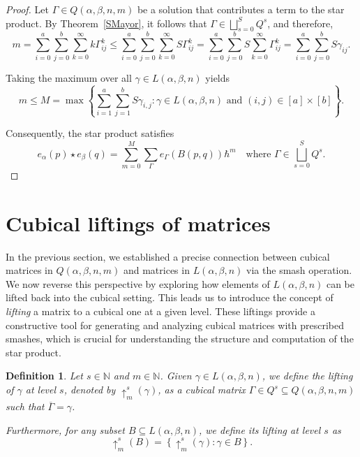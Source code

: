 \documentclass[11pt]{article}
\newtheorem{defi}[thm]{Definition}
\begin{document}
\begin{proof}
    Let $\Gamma \in Q(\alpha,\beta,n,m)$ be a solution that contributes a term to the star product. By Theorem~\ref{SMayor}, it follows that $\Gamma \in \bigsqcup_{s=0}^{S} Q^{s}$, and therefore,
    $$
    m=\sum_{i=0}^{a}\sum_{j=0}^{b}\sum_{k=0}^{\infty} k\Gamma_{ij}^{k}\leq
    \sum_{i=0}^{a}\sum_{j=0}^{b}\sum_{k=0}^{\infty} S\Gamma_{ij}^{k}=
    \sum_{i=0}^{a}\sum_{j=0}^{b} S\sum_{k=0}^{\infty}\Gamma_{ij}^{k}=
    \sum_{i=0}^{a}\sum_{j=0}^{b} S\gamma_{ij}.
    $$

    Taking the maximum over all $\gamma \in L(\alpha,\beta,n)$ yields
    $$
    m \leq M = \max\left\{\sum_{i=1}^{a}\sum_{j=1}^{b} S\gamma_{i,j} : \gamma \in L(\alpha,\beta,n) \text{ and } (i,j) \in [a] \times [b] \right\}.
    $$

    Consequently, the star product satisfies
    $$
    e_{\alpha}(p)\star e_{\beta}(q)=\sum_{m=0}^{M} \sum_{\Gamma} e_\Gamma(B(p,q)) \hbar^m \quad \text{where } \Gamma \in \bigsqcup_{s=0}^{S} Q^{s}.
    $$
\end{proof}


\section{Cubical liftings of matrices}

In the previous section, we established a precise connection between cubical matrices in $Q(\alpha, \beta, n, m)$ and matrices in $L(\alpha, \beta, n)$ via the smash operation. We now reverse this perspective by exploring how elements of $L(\alpha, \beta, n)$ can be lifted back into the cubical setting. This leads us to introduce the concept of \emph{lifting} a matrix to a cubical one at a given level. These liftings provide a constructive tool for generating and analyzing cubical matrices with prescribed smashes, which is crucial for understanding the structure and computation of the star product.



\begin{defi}
    Let $s \in \mathbb{N}$ and $m \in \mathbb{N}$. Given $\gamma \in L(\alpha, \beta, n)$, we define the \emph{lifting} of $\gamma$ at level $s$, denoted by $\uparrow_{m}^{s}(\gamma)$, as a cubical matrix $\Gamma \in Q^{s} \subseteq Q(\alpha, \beta, n, m)$ such that $\overline{\Gamma} = \gamma$.

  Furthermore, for any subset $B \subseteq L(\alpha, \beta, n)$, we define its lifting at level $s$ as
    $$
    \uparrow_{m}^{s}(B) = \left\{ \uparrow_{m}^{s}(\gamma) : \gamma \in B \right\}.
    $$
\end{defi}
\end{document}
